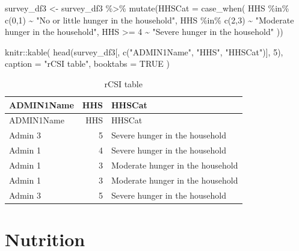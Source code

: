 \documentclass[
  letterpaper,
  DIV=11,
  numbers=noendperiod]{scrreprt}
\newenvironment{Shaded}{\begin{snugshade}}{\end{snugshade}}
\newcommand{\AttributeTok}[1]{\textcolor[rgb]{0.40,0.45,0.13}{#1}}
\newcommand{\ConstantTok}[1]{\textcolor[rgb]{0.56,0.35,0.01}{#1}}
\newcommand{\DecValTok}[1]{\textcolor[rgb]{0.68,0.00,0.00}{#1}}
\newcommand{\FunctionTok}[1]{\textcolor[rgb]{0.28,0.35,0.67}{#1}}
\newcommand{\NormalTok}[1]{\textcolor[rgb]{0.00,0.23,0.31}{#1}}
\newcommand{\OtherTok}[1]{\textcolor[rgb]{0.00,0.23,0.31}{#1}}
\newcommand{\SpecialCharTok}[1]{\textcolor[rgb]{0.37,0.37,0.37}{#1}}
\newcommand{\StringTok}[1]{\textcolor[rgb]{0.13,0.47,0.30}{#1}}
\begin{document}
\begin{Shaded}
\begin{Highlighting}[]
\NormalTok{survey\_df3 }\OtherTok{\textless{}{-}}\NormalTok{ survey\_df3 }\SpecialCharTok{\%\textgreater{}\%}
  \FunctionTok{mutate}\NormalTok{(}\AttributeTok{HHSCat =} \FunctionTok{case\_when}\NormalTok{(}
\NormalTok{    HHS }\SpecialCharTok{\%in\%} \FunctionTok{c}\NormalTok{(}\DecValTok{0}\NormalTok{,}\DecValTok{1}\NormalTok{) }\SpecialCharTok{\textasciitilde{}} \StringTok{"No or little hunger in the household"}\NormalTok{,}
\NormalTok{    HHS }\SpecialCharTok{\%in\%} \FunctionTok{c}\NormalTok{(}\DecValTok{2}\NormalTok{,}\DecValTok{3}\NormalTok{) }\SpecialCharTok{\textasciitilde{}} \StringTok{"Moderate hunger in the household"}\NormalTok{,}
\NormalTok{    HHS }\SpecialCharTok{\textgreater{}=} \DecValTok{4} \SpecialCharTok{\textasciitilde{}} \StringTok{"Severe hunger in the household"}
\NormalTok{  ))}
\end{Highlighting}
\end{Shaded}

\begin{Shaded}
\begin{Highlighting}[]
\NormalTok{knitr}\SpecialCharTok{::}\FunctionTok{kable}\NormalTok{(}
  \FunctionTok{head}\NormalTok{(survey\_df3[, }\FunctionTok{c}\NormalTok{(}\StringTok{"ADMIN1Name"}\NormalTok{, }\StringTok{"HHS"}\NormalTok{, }\StringTok{"HHSCat"}\NormalTok{)], }\DecValTok{5}\NormalTok{),}
  \AttributeTok{caption =} \StringTok{"rCSI table"}\NormalTok{,}
  \AttributeTok{booktabs =} \ConstantTok{TRUE}
\NormalTok{)}
\end{Highlighting}
\end{Shaded}

\begin{longtable}[]{@{}lrl@{}}
\caption{rCSI table}\tabularnewline
\toprule\noalign{}
ADMIN1Name & HHS & HHSCat \\
\midrule\noalign{}
\endfirsthead
\toprule\noalign{}
ADMIN1Name & HHS & HHSCat \\
\midrule\noalign{}
\endhead
\bottomrule\noalign{}
\endlastfoot
Admin 3 & 5 & Severe hunger in the household \\
Admin 1 & 4 & Severe hunger in the household \\
Admin 1 & 3 & Moderate hunger in the household \\
Admin 1 & 3 & Moderate hunger in the household \\
Admin 3 & 5 & Severe hunger in the household \\
\end{longtable}

\hypertarget{nutrition}{%
\section{Nutrition}\label{nutrition}}
\end{document}
